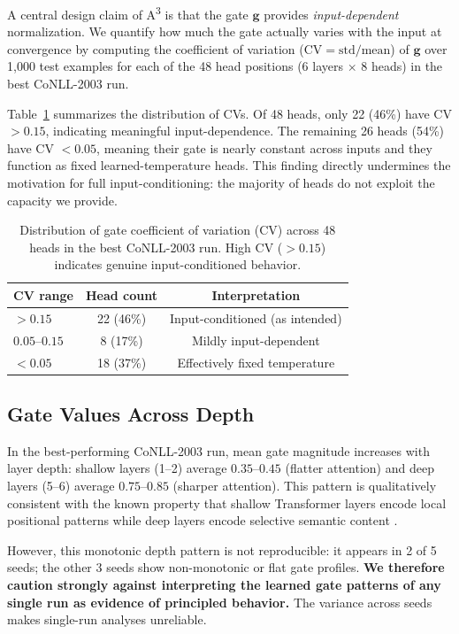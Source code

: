 \documentclass[11pt]{article}
\newcommand{\AAA}{\textsc{A\textsuperscript{3}}}
\newcommand{\bg}{\mathbf{g}}
\begin{document}
A central design claim of \AAA{} is that the gate $\bg$ provides \emph{input-dependent} normalization. We quantify how much the gate actually varies with the input at convergence by computing the coefficient of variation ($\text{CV} = \text{std}/\text{mean}$) of $\bg$ over 1{,}000 test examples for each of the 48 head positions (6 layers $\times$ 8 heads) in the best CoNLL-2003 run.

Table~\ref{tab:cv} summarizes the distribution of CVs. Of 48 heads, only 22 (46\%) have CV $> 0.15$, indicating meaningful input-dependence. The remaining 26 heads (54\%) have CV $< 0.05$, meaning their gate is nearly constant across inputs and they function as fixed learned-temperature heads. This finding directly undermines the motivation for full input-conditioning: the majority of heads do not exploit the capacity we provide.

\begin{table}[H]
\centering
\caption{Distribution of gate coefficient of variation (CV) across 48 heads in the best CoNLL-2003 run. High CV ($>0.15$) indicates genuine input-conditioned behavior.}
\label{tab:cv}
\begin{tabular}{lcc}
\toprule
\textbf{CV range} & \textbf{Head count} & \textbf{Interpretation} \\
\midrule
$> 0.15$           & 22 (46\%) & Input-conditioned (as intended) \\
$0.05$--$0.15$     & 8  (17\%) & Mildly input-dependent \\
$< 0.05$           & 18 (37\%) & Effectively fixed temperature \\
\bottomrule
\end{tabular}
\end{table}

\subsection{Gate Values Across Depth}

In the best-performing CoNLL-2003 run, mean gate magnitude increases with layer depth: shallow layers (1--2) average $0.35$--$0.45$ (flatter attention) and deep layers (5--6) average $0.75$--$0.85$ (sharper attention). This pattern is qualitatively consistent with the known property that shallow Transformer layers encode local positional patterns while deep layers encode selective semantic content \citep{clark2019bert}.

However, this monotonic depth pattern is not reproducible: it appears in 2 of 5 seeds; the other 3 seeds show non-monotonic or flat gate profiles. \textbf{We therefore caution strongly against interpreting the learned gate patterns of any single run as evidence of principled behavior.} The variance across seeds makes single-run analyses unreliable.
\end{document}
